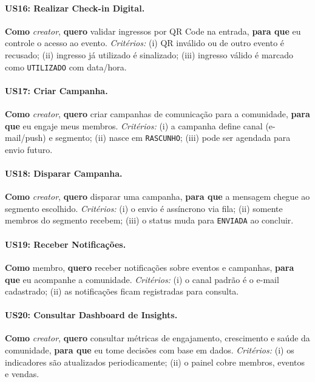 \documentclass[12pt, a4paper]{article}
\begin{document}
\paragraph{US16: Realizar Check-in Digital.}
\textbf{Como} \textit{creator}, \textbf{quero} validar ingressos por QR Code na
entrada, \textbf{para que} eu controle o acesso ao evento. \textit{Critérios:}
(i) QR inválido ou de outro evento é recusado; (ii) ingresso já utilizado é
sinalizado; (iii) ingresso válido é marcado como \texttt{UTILIZADO} com
data/hora.

\paragraph{US17: Criar Campanha.}
\textbf{Como} \textit{creator}, \textbf{quero} criar campanhas de comunicação
para a comunidade, \textbf{para que} eu engaje meus membros. \textit{Critérios:}
(i) a campanha define canal (e-mail/push) e segmento; (ii) nasce em
\texttt{RASCUNHO}; (iii) pode ser agendada para envio futuro.

\paragraph{US18: Disparar Campanha.}
\textbf{Como} \textit{creator}, \textbf{quero} disparar uma campanha,
\textbf{para que} a mensagem chegue ao segmento escolhido. \textit{Critérios:}
(i) o envio é assíncrono via fila; (ii) somente membros do segmento recebem;
(iii) o status muda para \texttt{ENVIADA} ao concluir.

\paragraph{US19: Receber Notificações.}
\textbf{Como} membro, \textbf{quero} receber notificações sobre eventos e
campanhas, \textbf{para que} eu acompanhe a comunidade. \textit{Critérios:}
(i) o canal padrão é o e-mail cadastrado; (ii) as notificações ficam
registradas para consulta.

\paragraph{US20: Consultar Dashboard de Insights.}
\textbf{Como} \textit{creator}, \textbf{quero} consultar métricas de
engajamento, crescimento e saúde da comunidade, \textbf{para que} eu tome
decisões com base em dados. \textit{Critérios:} (i) os indicadores são
atualizados periodicamente; (ii) o painel cobre membros, eventos e vendas.
\end{document}
